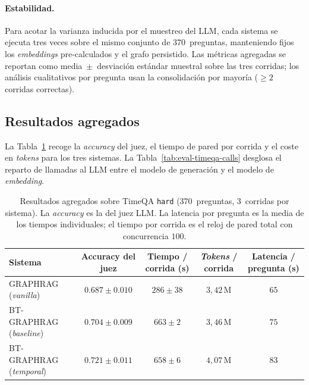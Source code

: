 \paragraph{Estabilidad.} Para acotar la varianza inducida por el muestreo del LLM, cada sistema se ejecuta tres veces sobre el mismo conjunto de 370~preguntas, manteniendo fijos los \emph{embeddings} pre-calculados y el grafo persistido. Las métricas agregadas se reportan como media~$\pm$~desviación estándar muestral sobre las tres corridas; los análisis cualitativos por pregunta usan la consolidación por mayoría ($\geq 2$ corridas correctas).

\subsection{Resultados agregados}\label{sec:eval-timeqa-aggregate}

La Tabla~\ref{tab:eval-timeqa-headline} recoge la \emph{accuracy} del juez, el tiempo de pared por corrida y el coste en \emph{tokens} para los tres sistemas. La Tabla~\ref{tab:eval-timeqa-calls} desglosa el reparto de llamadas al LLM entre el modelo de generación y el modelo de \emph{embedding}.

\begin{table}[h]
\centering
\small
\begin{tabular}{lcccc}
\hline
\textbf{Sistema} & \textbf{Accuracy del juez} & \textbf{Tiempo / corrida (s)} & \textbf{\emph{Tokens} / corrida} & \textbf{Latencia / pregunta (s)} \\ \hline
GRAPHRAG (\emph{vanilla})       & $0.687 \pm 0.010$ & $286 \pm 38$ & $3{,}42\,\text{M}$ & $65$ \\
BT-GRAPHRAG (\emph{baseline})   & $0.704 \pm 0.009$ & $663 \pm 2$  & $3{,}46\,\text{M}$ & $75$ \\
BT-GRAPHRAG (\emph{temporal})   & $\mathbf{0.721 \pm 0.011}$ & $658 \pm 6$  & $4{,}07\,\text{M}$ & $83$ \\ \hline
\end{tabular}
\caption{Resultados agregados sobre TimeQA \texttt{hard} (370~preguntas, 3~corridas por sistema). La \emph{accuracy} es la del juez LLM. La latencia por pregunta es la media de los tiempos individuales; el tiempo por corrida es el reloj de pared total con concurrencia $100$.}
\label{tab:eval-timeqa-headline}
\end{table}

